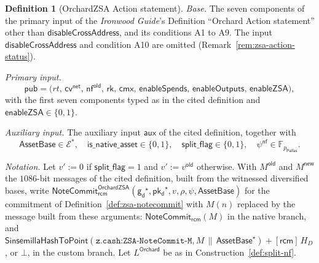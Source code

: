 \documentclass[11pt,a4paper]{article}
\theoremstyle{definition}
\newtheorem{definition}[theorem]{Definition}
\newcommand{\F}{\mathbb{F}}
\newcommand{\nfsym}{\mathsf{nf}}
\newcommand{\cmx}{\mathsf{cmx}}
\newcommand{\cvsym}{\mathsf{cv}}
\newcommand{\rk}{\mathsf{rk}}
\newcommand{\Pallas}{\ensuremath{\mathsf{Pallas}}}
\newcommand{\Ep}{\ensuremath{\mathcal{E}}}
\newcommand{\NoteCommit}{\ensuremath{\mathsf{NoteCommit}}}
\newcommand{\pkd}{\ensuremath{\mathsf{pk_d}}}
\newcommand{\gd}{\ensuremath{\mathsf{g_d}}}
\newcommand{\rcm}{\ensuremath{\mathsf{rcm}}}
\begin{document}
\begin{definition}[OrchardZSA Action statement]\label{def:zsa-action}
\emph{Base.} The seven components of the primary input of the
\emph{Ironwood Guide}'s Definition ``Orchard Action statement'' other than
$\mathsf{disableCrossAddress}$, and its conditions A1 to A9. The input
$\mathsf{disableCrossAddress}$ and condition A10 are omitted
(Remark~\ref{rem:zsa-action-status}).

\emph{Primary input.}
\[
  \mathsf{pub} = \bigl(\mathit{rt},\, \cvsym^{\mathsf{net}},\,
    \nfsym^{\mathsf{old}},\, \rk,\, \cmx,\, \mathsf{enableSpends},\,
    \mathsf{enableOutputs},\, \mathsf{enableZSA}\bigr),
\]
with the first seven components typed as in the cited definition and
$\mathsf{enableZSA} \in \{0, 1\}$.

\emph{Auxiliary input.} The auxiliary input $\mathsf{aux}$ of the cited
definition, together with
\[
  \mathsf{AssetBase} \in \Ep^{*}, \quad
  \mathsf{is\_native\_asset} \in \{0, 1\}, \quad
  \mathsf{split\_flag} \in \{0, 1\}, \quad
  \psi^{\mathsf{nf}} \in \F_{p_{\Pallas}}.
\]

\emph{Notation.} Let $v' := 0$ if $\mathsf{split\_flag} = 1$ and
$v' := v^{\mathsf{old}}$ otherwise. With $M^{\mathsf{old}}$ and
$M^{\mathsf{new}}$ the $1086$-bit messages of the cited definition, built
from the witnessed diversified bases, write
$\NoteCommit^{\mathsf{OrchardZSA}}_{\rcm}(\gd^{\star}, \pkd^{\star}, v,
\rho, \psi, \mathsf{AssetBase})$ for the commitment of
Definition~\ref{def:zsa-notecommit} with $M(n)$ replaced by the message
built from these arguments: $\NoteCommit_{\rcm}(M)$ in the native branch,
and
$\mathsf{SinsemillaHashToPoint}(\texttt{z.cash:ZSA-NoteCommit-M}, M \,\|\,
\mathsf{AssetBase}^{\star}) + [\rcm]\,H_D$, or $\bot$, in the custom
branch. Let $L^{\mathsf{Orchard}}$ be as in Construction~\ref{def:split-nf}.


\end{definition}
\end{document}
